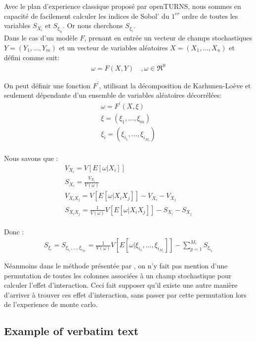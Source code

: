 \documentclass[a4paper,10pt]{article}
\begin{document}
Avec le plan d'experience classique proposé par openTURNS, nous sommes en capacité de facilement calculer les indices de Sobol' du $1^{er}$ ordre de toutes les variables $S_{X_{i}}$ et $S_{\xi_{i_{p}}}$. Or nous cherchons $S_{\xi_{i}}$.\\
Dans le cas d'un modèle $F$, prenant en entrée un vecteur de champs stochastiques $Y = (Y_{1},\ldots,Y_{m})$ et un vecteur de variables aléatoires $X = (X_{1},\ldots,X_{n})$ et défini comme suit:  
\begin{align}
\omega = F(X,Y) &\  ,\omega \in \Re^{\aleph}
\end{align}


On peut définir une fonction $F^{'}$, utilisant la décomposition de Karhunen-Loève et seulement dépendante d'un ensemble de variables aléatoires décorrélées: 
\begin{align}
\omega = F^{'}(X,\xi) \\
\xi = (\xi_{1},\ldots,\xi_{m})\\
\xi_{i} = (\xi_{i_{1}},\ldots,\xi_{i_{M_{i}}})
\end{align} \\

Nous savons que : 
\begin{align}
V_{X_{i}} = V[E[\omega|X_{i}]] \\
S_{X_{i}} = \frac{V_{X_{i}}}{V(\omega)} \\
V_{X_{i}X_{j}} = V[E[\omega|X_{i}X_{j}]] - V_{X_{i}} - V_{X_{j}} \\
S_{X_{i}X_{j}} = \frac{1}{V(\omega)}V[E[\omega|X_{i}X_{j}]] - S_{X_{i}} - S_{X_{j}}
\end{align} \\

Donc :
\begin{align}
S_{\xi_{i}} = S_{\xi_{i_{1}},\ldots,\xi_{i_{M_{i}}}} = \frac{1}{V(\omega)}V[E[\omega|\xi_{i_{1}},\ldots,\xi_{i_{M_{i}}}]] - \sum_{p=1}^{M_{i}}S_{\xi_{i_{p}}}
\end{align}


Néanmoins dans le méthode présentée par \cite{Wei2017May}, on n'y fait pas mention d'une permutation de toutes les colonnes associées à un champ stochastique pour calculer l'effet d'interaction. Ceci fait supposer qu'il existe une autre manière d'arriver à trouver ces effet d'interaction, sans passer par cette permutation lors de l'experience de monte carlo. 



\subsection{Example of verbatim text}
\end{document}
